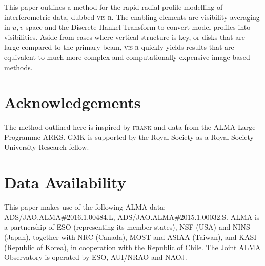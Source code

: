 \documentclass[fleqn,usenatbib]{mnras}
\begin{document}
This paper outlines a method for the rapid radial profile modelling of interferometric data, dubbed \textsc{vis-r}. The enabling elements are visibility averaging in $u,v$ space and the Discrete Hankel Transform to convert model profiles into visibilities. Aside from cases where vertical structure is key, or disks that are large compared to the primary beam, \textsc{vis-r} quickly yields results that are equivalent to much more complex and computationally expensive image-based methods.

\section*{Acknowledgements}

The method outlined here is inspired by \textsc{frank} \citep{2020MNRAS.tmp.1491J} and data from the ALMA Large Programme ARKS. GMK is supported by the Royal Society as a Royal Society University Research fellow.

\section*{Data Availability}

This paper makes use of the following ALMA data: ADS/JAO.ALMA\#2016.1.00484.L, ADS/JAO.ALMA\#2015.1.00032.S. ALMA is a partnership of ESO (representing its member states), NSF (USA) and NINS (Japan), together with NRC (Canada), MOST and ASIAA (Taiwan), and KASI (Republic of Korea), in cooperation with the Republic of Chile. The Joint ALMA Observatory is operated by ESO, AUI/NRAO and NAOJ.







\appendix
\end{document}
